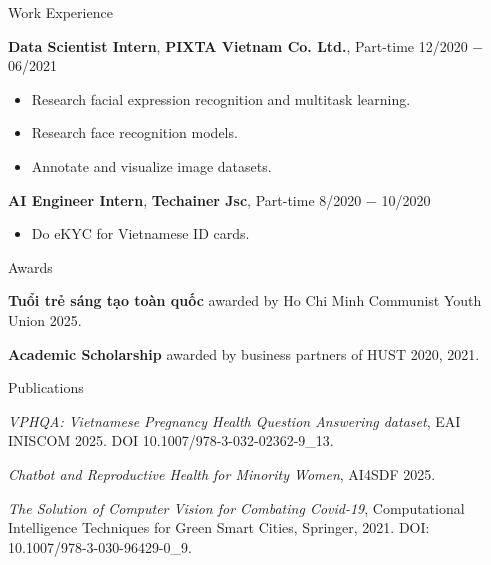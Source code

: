 \documentclass{resume} %
\begin{document}
\begin{rSection}{Work Experience}
\item \textbf{Data Scientist Intern}, \textbf{PIXTA Vietnam Co. Ltd.}, {Part-time} \hfill 12/2020 $-$ 06/2021
\begin{itemize}
\item Research facial expression recognition and multitask learning.
\item Research face recognition models.
\item Annotate and visualize image datasets.
\end{itemize}
\item \textbf{AI Engineer Intern}, \textbf{Techainer Jsc}, {Part-time}  \hfill 8/2020 $-$ 10/2020
\begin{itemize}
\item Do eKYC for Vietnamese ID cards.
\end{itemize}
\end{rSection} 
\begin{rSection}{Awards}
\vspace{-1.25em}
\item \textbf{Tuổi trẻ sáng tạo toàn quốc} {awarded by Ho Chi Minh Communist Youth Union} 
\hfill 2025.

\item \textbf{Academic Scholarship} {awarded by business partners of HUST} 
\hfill 2020, 2021.
\end{rSection} 
\begin{rSection}{Publications}
\vspace{-1.25em}
\item \textit{VPHQA: Vietnamese Pregnancy Health Question Answering dataset}, EAI INISCOM 2025. DOI
10.1007/978-3-032-02362-9\_13.

\item \textit{Chatbot and Reproductive Health for Minority Women}, AI4SDF 2025.

\item \textit{The Solution of Computer Vision for Combating Covid-19}, Computational Intelligence Techniques for Green Smart Cities, Springer, 2021. DOI: 10.1007/978-3-030-96429-0\_9.
\end{rSection}
\end{document}
